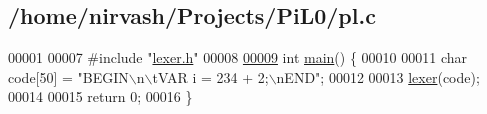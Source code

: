 \hypertarget{pl_8c_source}{\subsection{/home/nirvash/\-Projects/\-Pi\-L0/pl.c}
}

\begin{DoxyCode}
00001 
00007 \textcolor{preprocessor}{#include "\hyperlink{lexer_8h}{lexer.h}"}
00008 
\hypertarget{pl_8c_source_l00009}{}\hyperlink{pl_8c_ae66f6b31b5ad750f1fe042a706a4e3d4}{00009} \textcolor{keywordtype}{int} \hyperlink{pl_8c_ae66f6b31b5ad750f1fe042a706a4e3d4}{main}() \{
00010   
00011   \textcolor{keywordtype}{char} code[50] = \textcolor{stringliteral}{"BEGIN\(\backslash\)n\(\backslash\)tVAR i = 234 + 2;\(\backslash\)nEND"};
00012   
00013   \hyperlink{lexer_8c_ae6bbe9beac82b1e87f2dd4c3cdc1c9ba}{lexer}(code);
00014   
00015   \textcolor{keywordflow}{return} 0;
00016 \}
\end{DoxyCode}
